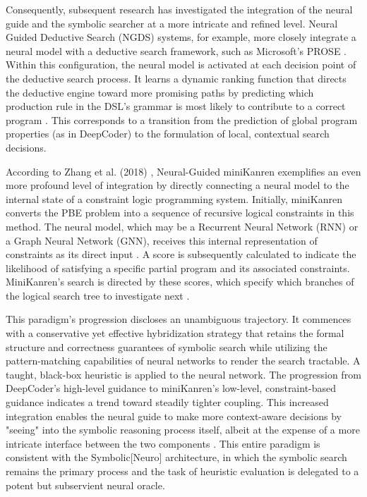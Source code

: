 \documentclass[12pt, a4paper]{report}
\begin{document}
Consequently, subsequent research has investigated the integration of the neural guide and the symbolic searcher at a more intricate and refined level. Neural Guided Deductive Search (NGDS) systems, for example, more closely integrate a neural model with a deductive search framework, such as Microsoft's PROSE \citep{ellis2021dreamcoder}. Within this configuration, the neural model is activated at each decision point of the deductive search process. It learns a dynamic ranking function that directs the deductive engine toward more promising paths by predicting which production rule in the DSL's grammar is most likely to contribute to a correct program \citep{ellis2021dreamcoder}. This corresponds to a transition from the prediction of global program properties (as in DeepCoder) to the formulation of local, contextual search decisions.

According to Zhang et al. (2018) \citep{zhang2018neural}, Neural-Guided miniKanren exemplifies an even more profound level of integration by directly connecting a neural model to the internal state of a constraint logic programming system. Initially, miniKanren converts the PBE problem into a sequence of recursive logical constraints in this method. The neural model, which may be a Recurrent Neural Network (RNN) or a Graph Neural Network (GNN), receives this internal representation of constraints as its direct input \citep{facchin2023neural}. A score is subsequently calculated to indicate the likelihood of satisfying a specific partial program and its associated constraints. MiniKanren's search is directed by these scores, which specify which branches of the logical search tree to investigate next \citep{facchin2023neural}.

This paradigm's progression discloses an unambiguous trajectory. It commences with a conservative yet effective hybridization strategy that retains the formal structure and correctness guarantees of symbolic search while utilizing the pattern-matching capabilities of neural networks to render the search tractable. A taught, black-box heuristic is applied to the neural network. The progression from DeepCoder's high-level guidance to miniKanren's low-level, constraint-based guidance indicates a trend toward steadily tighter coupling. This increased integration enables the neural guide to make more context-aware decisions by "seeing" into the symbolic reasoning process itself, albeit at the expense of a more intricate interface between the two components \citep{zhang2018neural}. This entire paradigm is consistent with the Symbolic[Neuro] architecture, in which the symbolic search remains the primary process and the task of heuristic evaluation is delegated to a potent but subservient neural oracle.
\end{document}
